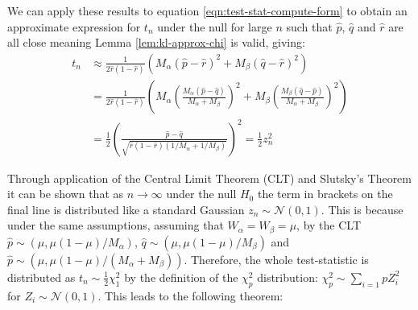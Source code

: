 \documentclass[]{article}
\newcommand{\Gaussian}{\mathcal{N}}
\begin{document}
We can apply these results to equation \ref{eqn:test-stat-compute-form} to obtain an approximate expression for $t_n$ under the null for large $n$ such that $\hat{p}$, $\hat{q}$ and $\hat{r}$ are all close meaning Lemma \ref{lem:kl-approx-chi} is valid, giving:
%
\begin{align}
	t_n &\approx \frac{1}{2 \hat{r}(1 - \hat{r})} \left( 
	M_\alpha \left(\hat{p} - \hat{r}\right)^2 +
	M_\beta \left(\hat{q} - \hat{r} \right)^2 
	\right) \nonumber \\
	&= \frac{1}{2 \hat{r}(1-\hat{r})} \left( 
	M_\alpha \left(\frac{M_\alpha (\hat{p} - \hat{q})}{M_\alpha + M_\beta} \right)^2 +
	M_\beta \left(\frac{M_\beta (\hat{q} - \hat{p})}{M_\alpha + M_\beta} \right)^2
	\right) \nonumber \\
	&= \frac{1}{2} \left( \frac{\hat{p} - \hat{q}}{\sqrt{\hat{r}(1- \hat{r})(1/M_\alpha + 1/M_\beta)}} \right)^2
	= \frac{1}{2} z_n^2
\end{align}

Through application of the Central Limit Theorem (CLT) and Slutsky's Theorem it can be shown that as $n \rightarrow \infty$ under the null $H_0$ the term in brackets on the final line is distributed like a standard Gaussian $z_n \sim \Gaussian(0,1)$. This is because under the same assumptions, assuming that $W_\alpha = W_\beta = \mu$, by the CLT $\hat{p} \sim (\mu, \mu(1 - \mu)/ M_\alpha)$, $\hat{q} \sim (\mu, \mu(1 - \mu)/ M_\beta)$ and $\hat{p} \sim (\mu, \mu(1 - \mu)/ (M_\alpha + M_\beta))$. Therefore, the whole test-statistic is distributed as $t_n \sim \frac{1}{2} \chi^2_1$ by the definition of the $\chi^2_p$ distribution: $\chi^2_p \sim \sum_{i=1}{p} Z_i^2$ for $Z_i \sim \Gaussian(0,1)$. This leads to the following theorem:
\end{document}
